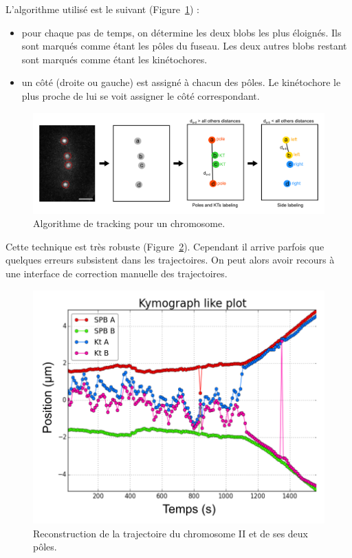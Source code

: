 \documentclass[12pt,a4paper,twoside,openright]{book}
\begin{document}
L'algorithme utilisé est le suivant (Figure~\ref{fig:algo_cen2}) :

\begin{itemize}
\item
  pour chaque pas de temps, on détermine les deux blobs les plus
  éloignés. Ils sont marqués comme étant les pôles du fuseau. Les deux
  autres blobs restant sont marqués comme étant les kinétochores.
\item
  un côté (droite ou gauche) est assigné à chacun des pôles. Le
  kinétochore le plus proche de lui se voit assigner le côté
  correspondant.
\end{itemize}

\begin{figure}[htbp]
\centering
\includegraphics{figures/results/imaging/algo_cen2.png}
\caption{\label{fig:algo_cen2}Algorithme de tracking pour un
chromosome.}
\end{figure}

Cette technique est très robuste (Figure~\ref{fig:cen2}). Cependant il
arrive parfois que quelques erreurs subsistent dans les trajectoires. On
peut alors avoir recours à une interface de correction manuelle des
trajectoires.

\begin{figure}[htbp]
\centering
\includegraphics{figures/results/imaging/cen2.png}
\caption{\label{fig:cen2}Reconstruction de la trajectoire du chromosome
II et de ses deux pôles.}
\end{figure}
\end{document}
